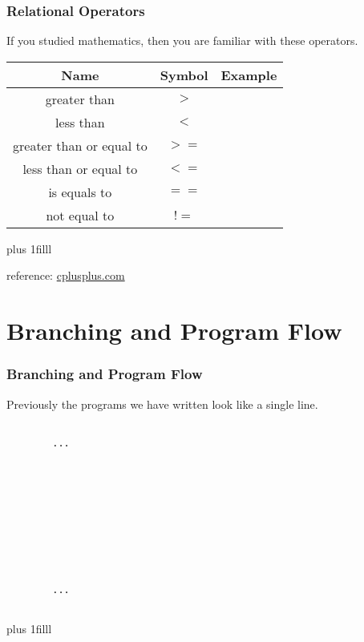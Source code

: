 \documentclass[fleqn]{beamer} %
\newcommand{\sectiontitleIII}{Relational Operators}
\newcommand{\sectiontitleIV}{Branching and Program Flow}
\newcommand{\btVFill}{\vskip0pt plus 1filll}
\begin{document}
	\begin{frame}[label=sectionIII,containsverbatim] \small
	\frametitle{\sectiontitleIII}
	
	If you studied mathematics, then you are familiar with these operators.  \vspace{5mm}\\
			
		\renewcommand*{\arraystretch}{1.5}
		\begin{tabular}{c|c|c} 
			Name&Symbol&Example\\ \hline
			greater than&$>$ & \\ \hline
			less than&$<$ & \\ \hline
			greater than or equal to&$>=$ & \\ \hline
			less than or equal to&$<=$ & \\ \hline
			is equals to&$==$ & \\ \hline
			not equal to&$!=$ & \\ \hline
		\end{tabular}
		
	
	\btVFill
	
	\tiny{reference: \href{https://www.cplusplus.com/doc/tutorial/operators/}{cplusplus.com} } 	
	
	\end{frame}



\section{\sectiontitleIV}	
	\begin{frame}[label=sectionIV,containsverbatim] \small
		\frametitle{\sectiontitleIV}    
	
		Previously the programs we have written look like a single line. 
	
		\begin{lstlisting}
		
		...
		
		
		
		
		
		
		
		
		
		
		...			
		
		\end{lstlisting}
		 

		\btVFill
	\end{frame}
\end{document}
